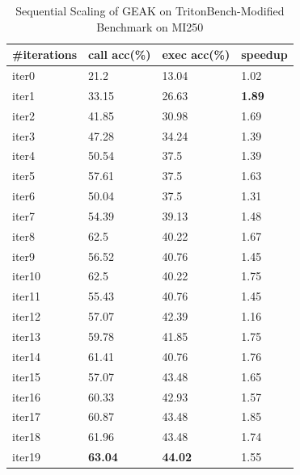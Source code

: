 \begin{table}
 \caption{Sequential Scaling of GEAK on TritonBench-Modified Benchmark on MI250}
  \centering
  \begin{tabular}{llll}
    \toprule
    \#iterations & call acc(\%) & exec acc(\%) & speedup  \\
    \midrule
    iter0 & 21.2 & 13.04 & 1.02 \\
    iter1 & 33.15 & 26.63 & \textbf{1.89} \\
    iter2 & 41.85 & 30.98 & 1.69 \\
    iter3 & 47.28 & 34.24 & 1.39 \\
    iter4 & 50.54 & 37.5 & 1.39  \\
    iter5 & 57.61 & 37.5 & 1.63 \\
    iter6 & 50.04 & 37.5 & 1.31 \\
    iter7 & 54.39 & 39.13 & 1.48 \\
    iter8 & 62.5 & 40.22 & 1.67 \\
    iter9 & 56.52 & 40.76 & 1.45 \\
    iter10 & 62.5 & 40.22 & 1.75 \\
    iter11 & 55.43 & 40.76 & 1.45 \\
    iter12 & 57.07 & 42.39 & 1.16 \\
    iter13 & 59.78 & 41.85 & 1.75 \\
    iter14 & 61.41 & 40.76 & 1.76 \\
    iter15 & 57.07 & 43.48 & 1.65 \\
    iter16 & 60.33 & 42.93 & 1.57 \\
    iter17 & 60.87 & 43.48 & 1.85 \\
    iter18 & 61.96 & 43.48 & 1.74 \\
    iter19 & \textbf{63.04} & \textbf{44.02} & 1.55 \\
   
    \bottomrule
  \end{tabular}
  \label{tab:sequential_scaling_mi250}
\end{table}